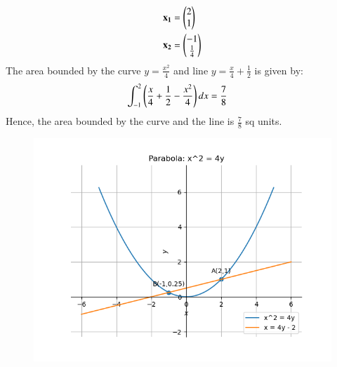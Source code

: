 \documentclass[journal]{IEEEtran}
\begin{document}
\begin{align}
	\mathbf{x_1} &= \begin{pmatrix}2 \\1\end{pmatrix}\\
	\mathbf{x_2} &= \begin{pmatrix}-1\\ \frac{1}{4}\end{pmatrix}
\end{align}
The area bounded by the curve $y = \frac{x^2}{4}$ and line $y = \frac{x}{4}+\frac{1}{2}$ is given by:
\begin{align}
	\int_{-1}^{2}\left(\frac{x}{4}+\frac{1}{2}-\frac{x^2}{4}\right)dx &= \frac{7}{8} 
\end{align}
Hence, the area bounded by the curve and the line is $\frac{7}{8}$ sq units.\\
\begin{figure}[h]
	\centering
	\includegraphics[scale=0.7]{figs/plot.png}
	\label{Fig}
\end{figure}
\end{document}
